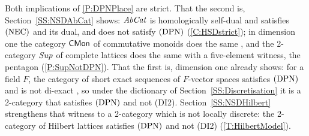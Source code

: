 \begin{remark}
  \label{Rem NSD Strict}
  Both implications of \prox\ref{P:DPNPlace} are strict. That the second is, Section~\ref{SS:NSDAbCat} shows: \(\mathit{AbCat}\) is homologically self-dual and satisfies \(\textup{(NEC)}\) and its dual, and does not satisfy \(\textup{(DPN)}\) (\corx\ref{C:HSDstrict}); in dimension one the category \(\mathsf{CMon}\) of commutative monoids does the same \cite[Example~4.2.1]{Afsa-24}, and the 2-category \(\mathit{Sup}\) of complete lattices does the same with a five-element witness, the pentagon (\prox\ref{P:SupNotDPN}). That the first is, dimension one already shows: for a field \(F\), the category of short exact sequences of \(F\)-vector spaces satisfies \(\textup{(DPN)}\) and is not di-exact \cite[Example~4.3.8]{Afsa-24}, so under the dictionary of Section~\ref{SS:Discretisation} it is a 2-category that satisfies \(\textup{(DPN)}\) and not \textup{(DI2)}. Section~\ref{SS:NSDHilbert} strengthens that witness to a 2-category which is not locally discrete: the 2-category of Hilbert lattices satisfies \(\textup{(DPN)}\) and not \textup{(DI2)} (\thex\ref{T:HilbertModel}).
\end{remark}

